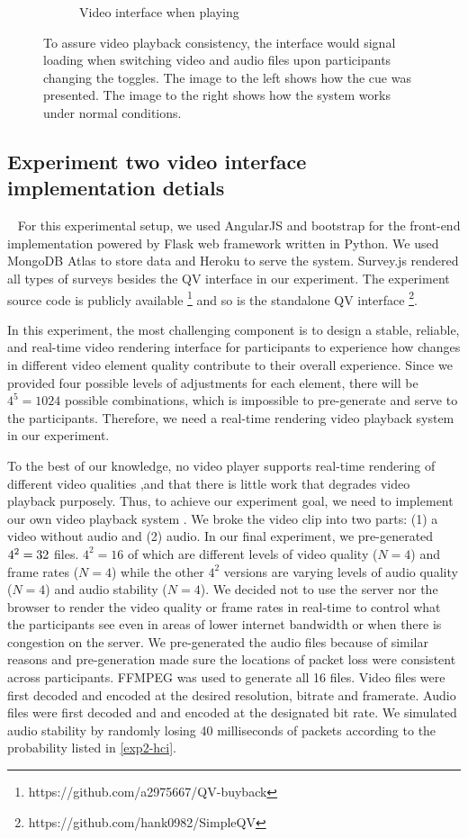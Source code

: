 \begin{figure}
\begin{subfigure}[ht]{0.49\textwidth}
         \caption{Video interface when playing}
         \label{fig:video_playing}
     \end{subfigure}
        \caption{To assure video playback consistency, the interface would signal loading when switching video and audio files upon participants changing the toggles. The image to the left shows how the cue was presented. The image to the right shows how the system works under normal conditions.}
        \label{fig:appendix_video_interface}
\end{figure}

\subsection{Experiment two video interface implementation detials}~\label{appx_video_interface}
For this experimental setup, we used AngularJS and bootstrap for the front-end implementation powered by Flask web framework written in Python. We used MongoDB Atlas to store data and Heroku to serve the system. Survey.js rendered all types of surveys besides the QV interface in our experiment. The experiment source code is publicly available \footnote{https://github.com/a2975667/QV-buyback} and so is the standalone QV interface \footnote{https://github.com/hank0982/SimpleQV}.

In this experiment, the most challenging component is to design a stable, reliable, and real-time video rendering interface for participants to experience how changes in different video element quality contribute to their overall experience. Since we provided four possible levels of adjustments for each element, there will be $4^5 = 1024$ possible combinations, which is impossible to pre-generate and serve to the participants. Therefore, we need a real-time rendering video playback system in our experiment. 

To the best of our knowledge, no video player supports real-time rendering of different video qualities ,and that there is little work that degrades video playback purposely. Thus, to achieve our experiment goal, we need to implement our own video playback system . We broke the video clip into two parts: (1) a video without audio and (2) audio. In our final experiment, we pre-generated $4^2 \time 2 = 32$ files. $4^2 =16$ of which are different levels of video quality ($N=4$) and frame rates ($N=4$) while the other $4^2$ versions are  varying levels of audio quality ($N=4$) and audio stability ($N=4$). We decided not to use the server nor the browser to render the video quality or frame rates in real-time to control what the participants see even in areas of lower internet bandwidth or when there is congestion on the server. We pre-generated the audio files because of similar reasons and pre-generation made sure the locations of packet loss were consistent across participants. FFMPEG was used to generate all 16 files. Video files were first decoded and encoded at the desired resolution, bitrate and framerate. Audio files were first decoded and and encoded at the designated bit rate. We simulated audio stability by randomly losing 40 milliseconds of packets according to the probability listed in \ref{exp2-hci}.


